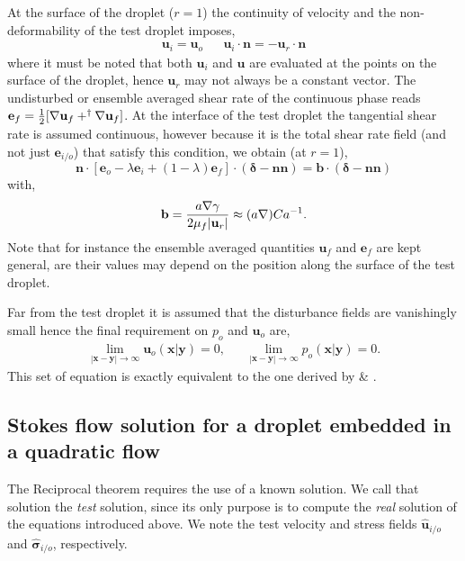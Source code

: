 At the surface of the droplet ($r = 1$) the continuity of velocity and the non-deformability of the test droplet imposes, 
\begin{align}
    \textbf{u}_{i} = \textbf{u}_{o}
    && 
    \textbf{u}_{i} \cdot \textbf{n}
    =
    - \textbf{u}_r \cdot \textbf{n}
    \label{eq:normal_vel}
\end{align}
where it must be noted that both $\textbf{u}_{i}$ and $\textbf{u}$ are evaluated at the points on the surface of the droplet, hence $\textbf{u}_r$ may not always be a constant vector. 
The undisturbed or ensemble averaged shear rate of the continuous phase reads  $\textbf{e}_f =\frac{1}{2} [\mathbf{\nabla} \textbf{u}_f + ^\dagger \mathbf{\nabla} \textbf{u}_f]$. 
At the interface of the test droplet the tangential shear rate is assumed continuous, however because it is the total shear rate field (and not just $\textbf{e}_{i/o}$) that satisfy this condition, we obtain (at $r=1$),
\begin{equation}
    \mathbf{n}\cdot [\textbf{e}_{o} - \lambda \textbf{e}_{i} + (1-\lambda)\textbf{e}_f
    ]\cdot (\bm\delta - \textbf{nn})
    =
    \textbf{b}\cdot (\bm\delta - \textbf{nn})
    \label{eq:boundary_cdt_stress}
\end{equation}
with, 
\begin{equation}
    \textbf{b}
    =
    \frac{a \mathbf{\nabla} \gamma}{2 \mu_f |\textbf{u}_r|}
    \approx (a\mathbf{\nabla}) Ca^{-1}. 
\end{equation}
Note that for instance the ensemble averaged quantities $\textbf{u}_f$ and $\textbf{e}_f$ are kept general, are their values may depend on the position along the surface of the test droplet. 


Far from the test droplet it is assumed that the disturbance fields are vanishingly small hence the final requirement on $p_{o}$ and $\textbf{u}_{o}$ are, 
\begin{align*}
    \lim_{|\textbf{x}-\textbf{y}|\to\infty }\textbf{u}_{o}(\textbf{x}|\textbf{y}) = 0,
    && \lim_{|\textbf{x}-\textbf{y}|\to\infty }p_{o}(\textbf{x}|\textbf{y})= 0. 
\end{align*}
This set of equation is exactly equivalent to the one derived by \cite{maxey1983equation} \& \citet{gatignol1983faxen}. 






\subsection{Stokes flow solution for a droplet embedded in a quadratic flow}
The Reciprocal theorem requires the use of a known solution.
We call that solution the \textit{test} solution, since its only purpose is to compute the \textit{real} solution of the equations introduced above. 
We note the test velocity and stress fields $\hat{\textbf{u}}_{i/o}$ and $\hat{\bm\sigma}_{i/o}$, respectively. 

